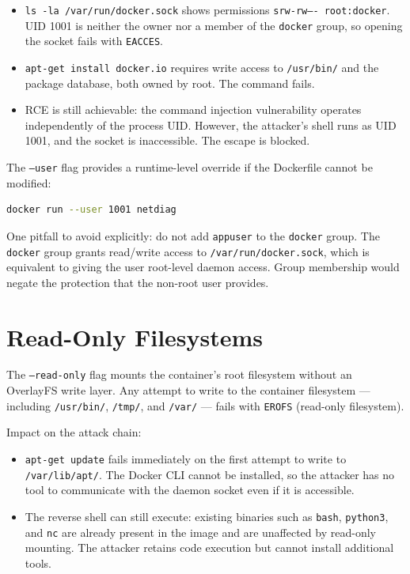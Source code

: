 \begin{itemize}
    \item \texttt{ls -la /var/run/docker.sock} shows permissions \texttt{srw-rw---- root:docker}. UID 1001 is neither the owner nor a member of the \texttt{docker} group, so opening the socket fails with \texttt{EACCES}.
    \item \texttt{apt-get install docker.io} requires write access to \texttt{/usr/bin/} and the package database, both owned by root. The command fails.
    \item RCE is still achievable: the command injection vulnerability operates independently of the process UID. However, the attacker's shell runs as UID 1001, and the socket is inaccessible. The escape is blocked.
\end{itemize}

The \texttt{--user} flag provides a runtime-level override if the Dockerfile cannot be modified:

\begin{lstlisting}[language=bash]
docker run --user 1001 netdiag
\end{lstlisting}

One pitfall to avoid explicitly: do not add \texttt{appuser} to the \texttt{docker} group. The \texttt{docker} group grants read/write access to \texttt{/var/run/docker.sock}, which is equivalent to giving the user root-level daemon access. Group membership would negate the protection that the non-root user provides.


\section{Read-Only Filesystems}

The \texttt{--read-only} flag mounts the container's root filesystem without an OverlayFS write layer. Any attempt to write to the container filesystem --- including \texttt{/usr/bin/}, \texttt{/tmp/}, and \texttt{/var/} --- fails with \texttt{EROFS} (read-only filesystem).

Impact on the attack chain:

\begin{itemize}
    \item \texttt{apt-get update} fails immediately on the first attempt to write to \texttt{/var/lib/apt/}. The Docker CLI cannot be installed, so the attacker has no tool to communicate with the daemon socket even if it is accessible.
    \item The reverse shell can still execute: existing binaries such as \texttt{bash}, \texttt{python3}, and \texttt{nc} are already present in the image and are unaffected by read-only mounting. The attacker retains code execution but cannot install additional tools.
\end{itemize}

